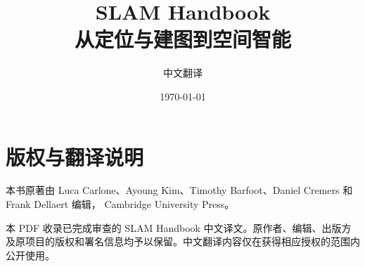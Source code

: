 \documentclass[UTF8,fontset=fandol,oneside]{ctexbook}
\begin{document}
\frontmatter
\title{SLAM Handbook\\从定位与建图到空间智能}
\author{中文翻译}
\date{\today}
\maketitle

\chapter*{版权与翻译说明}

本书原著由 Luca Carlone、Ayoung Kim、Timothy Barfoot、Daniel Cremers 和 Frank Dellaert 编辑，\textcopyright{} Cambridge University Press。

本 PDF 收录已完成审查的 SLAM Handbook 中文译文。原作者、编辑、出版方及原项目的版权和署名信息均予以保留。中文翻译内容仅在获得相应授权的范围内公开使用。

\tableofcontents

\mainmatter


\backmatter
\end{document}

